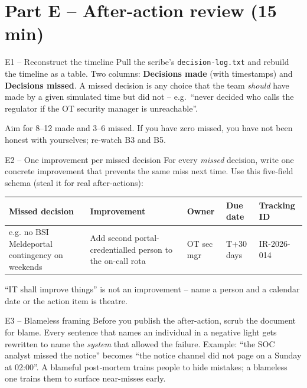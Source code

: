 \documentclass[11pt,a4paper]{article}
\begin{document}
\section*{Part E -- After-action review (15 min)}

\begin{stepbox}{E1 -- Reconstruct the timeline}
Pull the scribe's \texttt{decision-log.txt} and rebuild the timeline as a table. Two columns: \textbf{Decisions made} (with timestamps) and \textbf{Decisions missed}. A missed decision is any choice that the team \emph{should} have made by a given simulated time but did not -- e.g.\ ``never decided who calls the regulator if the OT security manager is unreachable''.

Aim for 8--12 made and 3--6 missed. If you have zero missed, you have not been honest with yourselves; re-watch B3 and B5.
\end{stepbox}

\begin{stepbox}{E2 -- One improvement per missed decision}
For every \emph{missed} decision, write one concrete improvement that prevents the same miss next time. Use this five-field schema (steal it for real after-actions):

\vspace{1mm}
{\setlength{\tabcolsep}{3pt}\footnotesize
\begin{tabular}{p{3.0cm}p{4.0cm}p{2cm}p{2cm}p{1.6cm}}
\toprule
\textbf{Missed decision} & \textbf{Improvement} & \textbf{Owner} & \textbf{Due date} & \textbf{Tracking ID} \\
\midrule
e.g. no BSI Meldeportal contingency on weekends & Add second portal-credentialled person to the on-call rota & OT sec mgr & T+30 days & IR-2026-014 \\
\bottomrule
\end{tabular}}

\vspace{1mm}
``IT shall improve things'' is not an improvement -- name a person and a calendar date or the action item is theatre.
\end{stepbox}

\begin{stepbox}{E3 -- Blameless framing}
Before you publish the after-action, scrub the document for blame. Every sentence that names an individual in a negative light gets rewritten to name the \emph{system} that allowed the failure. Example: ``the SOC analyst missed the notice'' becomes ``the notice channel did not page on a Sunday at 02:00''. A blameful post-mortem trains people to hide mistakes; a blameless one trains them to surface near-misses early.
\end{stepbox}
\end{document}
